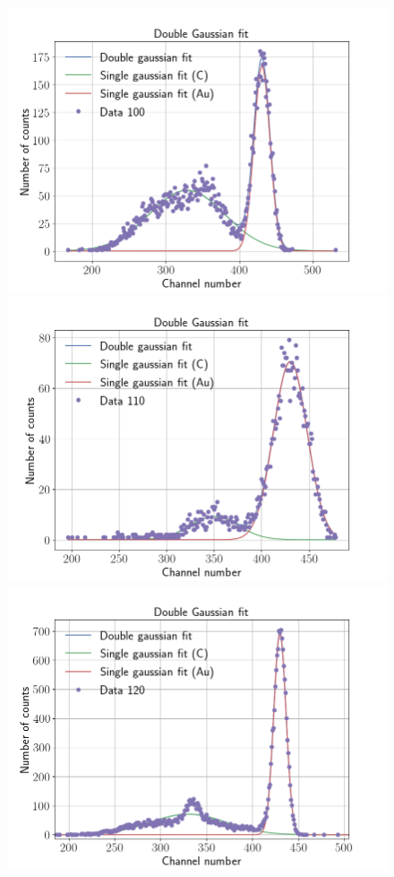 \newpage
\begin{figure}
    \centering
\includegraphics[width=0.99\columnwidth]{Data_100}
\includegraphics[width=0.99\columnwidth]{Data_110}
\includegraphics[width=0.99\columnwidth]{Data_120}

\end{figure}
